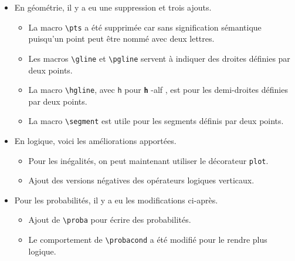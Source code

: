 \documentclass[12pt,a4paper]{article}
\newcommand\env[1]{\texttt{#1}}
\newcommand\macro[1]{\env{\textbackslash{}#1}}
\theoremstyle{definition}
\newcommand\whyprefix[2]{%
	\textbf{\prefix{#1}}-#2%
}
\newcommand\prefix[1]{%
	\texttt{#1}%
}
\begin{document}
\begin{description}
\begin{itemize}[itemsep=.5em]
    
    
    
        \item En géométrie, il y a eu une suppression et trois ajouts.
        \begin{itemize}[itemsep=.5em]
            \item La macro \macro{pts} a été supprimée car sans signification sémantique puisqu'un point peut être nommé avec deux lettres.
    
            \item Les macros \macro{gline} et \macro{pgline} servent à indiquer des droites définies par deux points.
    
            \item La macro \macro{hgline}, avec \prefix{h} pour \whyprefix{h}{alf}, est pour les demi-droites définies par deux points.
    
            \item La macro \macro{segment} est utile pour les segments définis par deux points.
        \end{itemize}
    
    
    
    
        \item En logique, voici les améliorations apportées.
        \begin{itemize}[itemsep=.5em]
            \item Pour les inégalités, on peut maintenant utiliser le décorateur \verb+plot+.
    
    		\item Ajout des versions négatives des opérateurs logiques verticaux.
        \end{itemize}
    
    
    
    
        \item Pour les probabilités, il y a eu les modifications ci-après.
        \begin{itemize}[itemsep=.5em]
            \item Ajout de \macro{proba} pour écrire des probabilités.
    
    		\item Le comportement de \macro{probacond} a été modifié pour le rendre plus logique.
        \end{itemize}
    \end{itemize}



\end{description}
\end{document}
